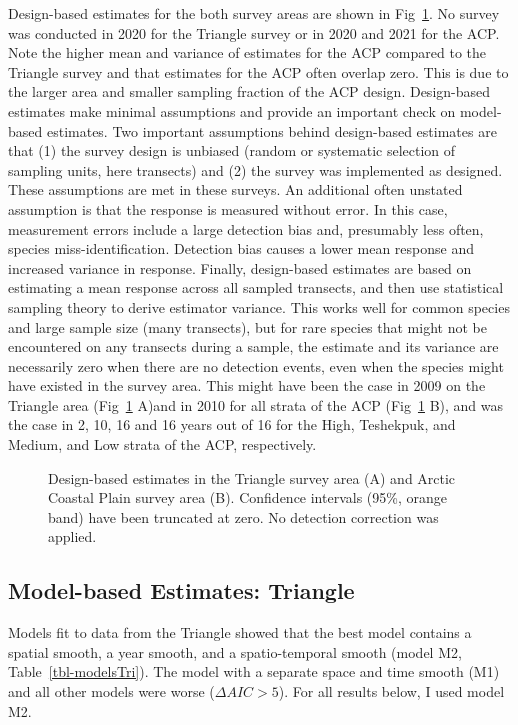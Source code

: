 \documentclass[
  10pt,
  letterpaper,
]{article}
\begin{document}
Design-based estimates for the both survey areas are shown in
Fig~\ref{fig-design}. No survey was conducted in 2020 for the Triangle
survey or in 2020 and 2021 for the ACP. Note the higher mean and
variance of estimates for the ACP compared to the Triangle survey and
that estimates for the ACP often overlap zero. This is due to the larger
area and smaller sampling fraction of the ACP design. Design-based
estimates make minimal assumptions and provide an important check on
model-based estimates. Two important assumptions behind design-based
estimates are that (1) the survey design is unbiased (random or
systematic selection of sampling units, here transects) and (2) the
survey was implemented as designed. These assumptions are met in these
surveys. An additional often unstated assumption is that the response is
measured without error. In this case, measurement errors include a large
detection bias and, presumably less often, species miss-identification.
Detection bias causes a lower mean response and increased variance in
response. Finally, design-based estimates are based on estimating a mean
response across all sampled transects, and then use statistical sampling
theory to derive estimator variance. This works well for common species
and large sample size (many transects), but for rare species that might
not be encountered on any transects during a sample, the estimate and
its variance are necessarily zero when there are no detection events,
even when the species might have existed in the survey area. This might
have been the case in 2009 on the Triangle area (Fig~\ref{fig-design}
A)and in 2010 for all strata of the ACP (Fig~\ref{fig-design} B), and
was the case in 2, 10, 16 and 16 years out of 16 for the High,
Teshekpuk, and Medium, and Low strata of the ACP, respectively.

\begin{figure}

\caption{\label{fig-design}Design-based estimates in the Triangle survey
area (A) and Arctic Coastal Plain survey area (B). Confidence intervals
(95\%, orange band) have been truncated at zero. No detection correction
was applied.}

\end{figure}%

\subsection{Model-based Estimates:
Triangle}\label{model-based-estimates-triangle}

Models fit to data from the Triangle showed that the best model contains
a spatial smooth, a year smooth, and a spatio-temporal smooth (model M2,
Table~\ref{tbl-modelsTri}). The model with a separate space and time
smooth (M1) and all other models were worse (\(\Delta AIC >5\)). For all
results below, I used model M2.
\end{document}
